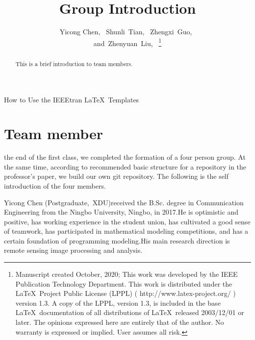 \documentclass[lettersize,journal]{IEEEtran}
\begin{document}
\title{Group Introduction}

		\author{Yicong Chen,~
		Shunli~Tian,~
		Zhengxi~Guo,~
	
		and~Zhenyuan~Liu,~%
\thanks{Manuscript created October, 2020; This work was developed by the IEEE Publication Technology Department. This work is distributed under the \LaTeX \ Project Public License (LPPL) ( http://www.latex-project.org/ ) version 1.3. A copy of the LPPL, version 1.3, is included in the base \LaTeX \ documentation of all distributions of \LaTeX \ released 2003/12/01 or later. The opinions expressed here are entirely that of the author. No warranty is expressed or implied. User assumes all risk.}}

%
{How to Use the IEEEtran \LaTeX \ Templates}

\maketitle

\begin{abstract}
This is a brief introduction to team members.
\end{abstract}



\section{Team member}
 the end of the first class, we completed the formation of a four person group. At the same time, according to recommended basic structure for a repository in the professor's paper, we build our own git repository. The following is the self introduction of the four members. 



\begin{IEEEbiography}{Yicong Chen}
(Postgraduate,~XDU)received the B.Sc. degree in Communication Engineering from the Ningbo University, Ningbo, in 2017.He is optimistic and positive, has working experience in the student union, has cultivated a good sense of teamwork, has participated in mathematical modeling competitions, and has a certain foundation of programming modeling.His main research direction is remote sensing image processing and analysis.\end{IEEEbiography}
\end{document}
